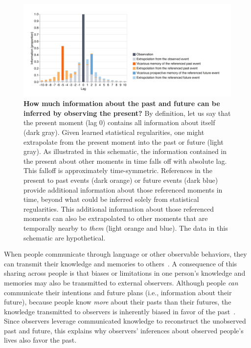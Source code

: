 \documentclass[10pt]{article}
\begin{document}
\begin{figure}[tp]
  \centering
  \includegraphics[width=\textwidth]{discussion}

  \caption{\textbf{How much information about the past and future can be
  inferred by observing the present?} By definition, let us say that the
  present moment (lag 0) contains all information about itself (dark gray).
  Given learned statistical regularities, one might extrapolate from the
  present moment into the past or future (light gray). As illustrated in this
  schematic, the information contained in the present about other moments in
  time falls off with absolute lag. This falloff is approximately
  time-symmetric. References in the present to past events (dark orange) or
  future events (dark blue) provide additional information about those
  referenced moments in time, beyond what could be inferred solely from
  statistical regularities. This additional information about those referenced
  moments can also be extrapolated to other moments that are temporally nearby
  to \textit{them} (light orange and blue). The data in this schematic are
  hypothetical.}

  \label{fig:discussion}
\end{figure}

When people communicate through language or other observable behaviors, they
can transmit their knowledge and memories to others~\citep{HirsEcht12,
MahrCsib18, Dess07, ZadbEtal17}. A consequence of this sharing across people is
that biases or limitations in one person's knowledge and memories may also be
transmitted to external observers. Although people \textit{can} communicate
their intentions and future plans (i.e., information about their future),
because people know \textit{more} about their pasts than their futures, the
knowledge transmitted to observers is inherently biased in favor of the
past~\citep[Fig.~\ref{fig:discussion}; ][]{DemiEtal18}. Since observers
leverage communicated knowledge to reconstruct the unobserved past and future,
this explains why observers' inferences about observed people's lives also
favor the past.
\end{document}
